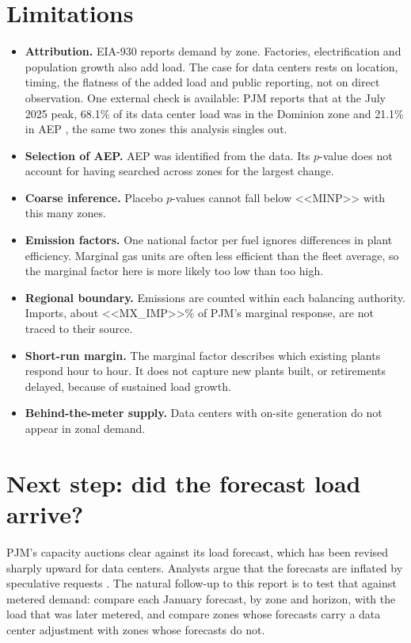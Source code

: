 \documentclass[11pt,a4paper]{article}
\begin{document}
\section{Limitations}\label{sec:limits}
\begin{itemize}
\item \textbf{Attribution.} EIA-930 reports demand by zone. Factories, electrification and population growth also add load. The case for data centers rests on location, timing, the flatness of the added load and public reporting, not on direct observation. One external check is available: PJM reports that at the July 2025 peak, 68.1\% of its data center load was in the Dominion zone and 21.1\% in AEP \cite{pjmaccuracy}, the same two zones this analysis singles out.
\item \textbf{Selection of AEP.} AEP was identified from the data. Its $p$-value does not account for having searched across zones for the largest change.
\item \textbf{Coarse inference.} Placebo $p$-values cannot fall below <<MINP>> with this many zones.
\item \textbf{Emission factors.} One national factor per fuel ignores differences in plant efficiency. Marginal gas units are often less efficient than the fleet average, so the marginal factor here is more likely too low than too high.
\item \textbf{Regional boundary.} Emissions are counted within each balancing authority. Imports, about <<MX_IMP>>\% of PJM's marginal response, are not traced to their source.
\item \textbf{Short-run margin.} The marginal factor describes which existing plants respond hour to hour. It does not capture new plants built, or retirements delayed, because of sustained load growth.
\item \textbf{Behind-the-meter supply.} Data centers with on-site generation do not appear in zonal demand.
\end{itemize}

\section{Next step: did the forecast load arrive?}\label{sec:next}
PJM's capacity auctions clear against its load forecast, which has been revised sharply upward for data centers. Analysts argue that the forecasts are inflated by speculative requests \cite{gridstrategies}. The natural follow-up to this report is to test that against metered demand: compare each January forecast, by zone and horizon, with the load that was later metered, and compare zones whose forecasts carry a data center adjustment with zones whose forecasts do not.
\end{document}
